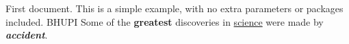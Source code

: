 \documentclass{article}
\begin{document}
First document. This is a simple example, with no 
extra parameters or packages included.
BHUPI
Some of the \textbf{greatest}
discoveries in \underline{science} 
were made by \textbf{\textit{accident}}.
\end{document}
